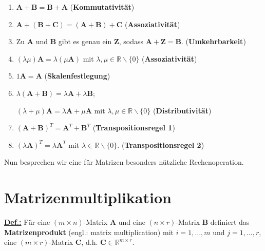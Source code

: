 \begin{enumerate}
	\item $\mathbf{A}+\mathbf{B} = \mathbf{B}+\mathbf{A}$
	\hfill ({\bf Kommutativit\"at})
	\item $\mathbf{A}+(\mathbf{B}+\mathbf{C})
	= (\mathbf{A}+\mathbf{B})+\mathbf{C}$
	\hfill ({\bf Assoziativit\"at})
	\item Zu $\mathbf{A}$ und $\mathbf{B}$ gibt es genau ein
	$\mathbf{Z}$, sodass $\mathbf{A}+\mathbf{Z}=\mathbf{B}$.
	\hfill ({\bf Umkehrbarkeit})
	\item $(\lambda\mu)\mathbf{A}=\lambda(\mu\mathbf{A})$
	mit $\lambda,\mu	\in \mathbb{R} \backslash \{0\}$ 
	\hfill ({\bf Assoziativit\"at})
	\item $1\mathbf{A}=\mathbf{A}$
	\hfill ({\bf Skalenfestlegung})
	\item $\lambda(\mathbf{A}+\mathbf{B})
	= \lambda\mathbf{A}+\lambda\mathbf{B}$;
	
	$(\lambda+\mu)\mathbf{A} = \lambda\mathbf{A}+\mu\mathbf{A}$
	mit $\lambda, \mu	\in \mathbb{R} \backslash \{0\}$
	\hfill ({\bf Distributivit\"at})
	
	\item $(\mathbf{A}+\mathbf{B})^{T} = \mathbf{A}^{T} + \mathbf{B}^{T}$ \hfill ({\bf Transpositionsregel 1})
	
	\item $(\lambda\mathbf{A})^{T} = \lambda\mathbf{A}^{T}$ mit $\lambda \in \mathbb{R} \backslash \{0\}$. \hfill ({\bf Transpositionsregel 2})
\end{enumerate}

\medskip
\noindent
Nun besprechen wir eine f\"ur Matrizen besonders n\"utzliche
Rechenoperation.

\section[Matrizenmultiplikation]%
{Matrizenmultiplikation}

\noindent
\underline{\bf Def.:}
F\"ur eine $(m \times n)$-Matrix $\mathbf{A}$ und eine
$(n \times r)$-Matrix $\mathbf{B}$
definiert das {\bf Matrizenprodukt} (engl.: matrix multiplication)
%
\be
{}
\ee
%
mit $i=1,\ldots,m$ und $j=1,\ldots,r$, eine
$(m \times r)$-Matrix $\mathbf{C}$, d.h. $\mathbf{C} \in
\mathbb{R}^{m \times r}$.

